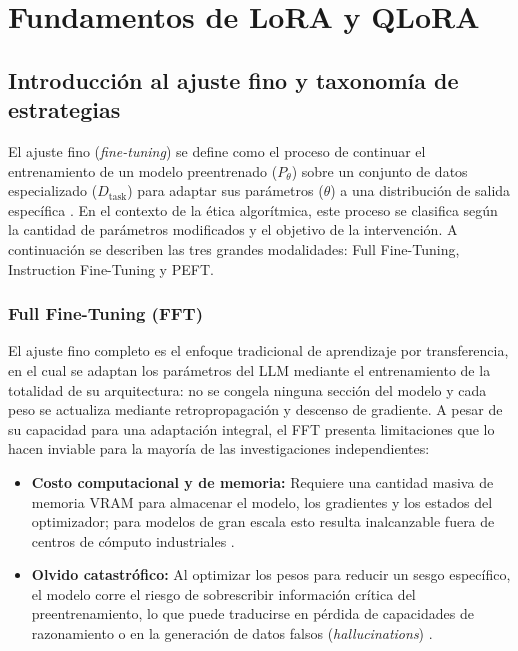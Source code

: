 \documentclass[12pt,a4paper]{report}
\begin{document}
\section{Fundamentos de LoRA y QLoRA}
\label{sec:lora_qlora}

\subsection{Introducción al ajuste fino y taxonomía de estrategias}
\label{subsec:taxonomia_finetuning}

El ajuste fino (\textit{fine-tuning}) se define como el proceso de continuar el entrenamiento de un modelo preentrenado ($P_\theta$) sobre un conjunto de datos especializado ($D_{\text{task}}$) para adaptar sus parámetros ($\theta$) a una distribución de salida específica \cite{anisuzzaman_fine-tuning_2025}. En el contexto de la ética algorítmica, este proceso se clasifica según la cantidad de parámetros modificados y el objetivo de la intervención. A continuación se describen las tres grandes modalidades: Full Fine-Tuning, Instruction Fine-Tuning y PEFT.

\subsubsection{Full Fine-Tuning (FFT)}
\label{subsubsec:fft}

El ajuste fino completo es el enfoque tradicional de aprendizaje por transferencia, en el cual se adaptan los parámetros del LLM mediante el entrenamiento de la totalidad de su arquitectura: no se congela ninguna sección del modelo y cada peso se actualiza mediante retropropagación y descenso de gradiente. A pesar de su capacidad para una adaptación integral, el FFT presenta limitaciones que lo hacen inviable para la mayoría de las investigaciones independientes:

\begin{itemize}
    \item \textbf{Costo computacional y de memoria:} Requiere una cantidad masiva de memoria VRAM para almacenar el modelo, los gradientes y los estados del optimizador; para modelos de gran escala esto resulta inalcanzable fuera de centros de cómputo industriales \cite{pratap_fine_2025}.
    \item \textbf{Olvido catastrófico:} Al optimizar los pesos para reducir un sesgo específico, el modelo corre el riesgo de sobrescribir información crítica del preentrenamiento, lo que puede traducirse en pérdida de capacidades de razonamiento o en la generación de datos falsos (\textit{hallucinations}) \cite{anisuzzaman_fine-tuning_2025}.
\end{itemize}
\end{document}
